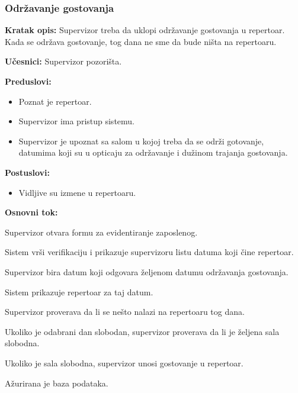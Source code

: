 \documentclass[a4paper]{article}
\begin{document}
\subsubsection{Održavanje gostovanja} 
\noindent\textbf{Kratak opis:} Supervizor treba da uklopi održavanje gostovanja u repertoar. Kada se održava gostovanje, tog dana ne sme da bude ništa na repertoaru.

\noindent\textbf{Učesnici:} Supervizor pozorišta.

\noindent\textbf{Preduslovi:}
  \begin{itemize}
    \item Poznat je repertoar.
    \item Supervizor ima pristup sistemu.
    \item Supervizor je upoznat sa salom u kojoj treba da se održi gotovanje, datumima koji su u opticaju za održavanje i dužinom trajanja gostovanja.
  \end{itemize}

\noindent\textbf{Postuslovi:} 
  \begin{itemize}
    \item Vidljive su izmene u repertoaru.
  \end{itemize}

\noindent\textbf{Osnovni tok:}
  \begin{legal}
    \item Supervizor otvara formu za evidentiranje zaposlenog.
    \item Sistem vrši verifikaciju i prikazuje supervizoru listu datuma koji čine repertoar.
    \item Supervizor bira datum koji odgovara željenom datumu održavanja gostovanja.
    \item Sistem prikazuje repertoar za taj datum.
    \item Supervizor proverava da li se nešto nalazi na repertoaru tog dana.
    \item Ukoliko je odabrani dan slobodan, supervizor proverava da li je željena sala slobodna.
    \item Ukoliko je sala slobodna, supervizor unosi gostovanje u repertoar.
    \item Ažurirana je baza podataka.
  \end{legal}
\end{document}
